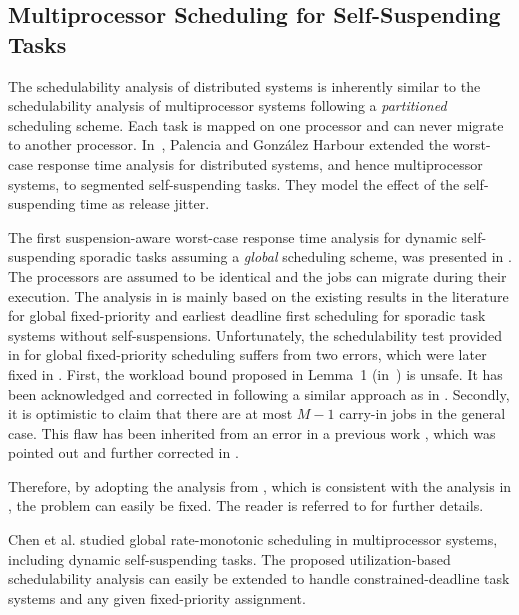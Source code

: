 \subsection{Multiprocessor Scheduling for Self-Suspending Tasks}
\label{sec:multiprocessor-HRT}
  
The schedulability analysis of distributed systems is inherently similar to the schedulability analysis of multiprocessor systems following a 
\emph{partitioned} scheduling scheme. Each task is mapped on one processor and can never migrate to another processor. In~\cite{PH:rtss98}, 
Palencia and Gonz\'alez Harbour extended the worst-case response time analysis for distributed systems, and hence multiprocessor systems, to segmented self-suspending tasks. They model the effect of the self-suspending time as release jitter.
  
The first suspension-aware worst-case response time analysis for dynamic self-suspending sporadic tasks assuming a \emph{global} scheduling scheme, was presented in \cite{DBLP:conf/ecrts/LiuA13}. 
The processors are assumed to be identical and the jobs can migrate during their execution. The analysis in \cite{DBLP:conf/ecrts/LiuA13} is mainly based on the existing results in the literature for global fixed-priority and earliest deadline first scheduling for sporadic task systems without self-suspensions. Unfortunately, the schedulability test provided in \cite{DBLP:conf/ecrts/LiuA13} for global fixed-priority scheduling suffers from two errors, which were later fixed in \cite{erratu-cong-anderson}. First, the workload bound proposed in Lemma~1 (in~\cite{DBLP:conf/ecrts/LiuA13}) is unsafe. It has been acknowledged and corrected in \cite{erratu-cong-anderson} following a similar approach as in \cite{baruah2007techniques}. 
Secondly, it is optimistic to claim that there are at most $M-1$ carry-in jobs in the general case. This flaw has been inherited from an error in a 
previous work \cite{DBLP:conf/rtss/GuanSYY09}, which was pointed out and further corrected in \cite{sun2014improving,DBLP:conf/rtns/HuangC15}. 

Therefore, by adopting the analysis from \cite{DBLP:conf/rtns/HuangC15}, which is consistent with the analysis in \cite{DBLP:conf/ecrts/LiuA13}, the problem can easily be fixed. The reader is referred to \cite{erratu-cong-anderson} for further details.
  
Chen et al. \cite{ChenHLRTSS2015} studied global rate-monotonic scheduling in multiprocessor systems, including dynamic self-suspending tasks. The proposed utilization-based schedulability analysis  can easily be extended to handle constrained-deadline task systems and any given fixed-priority assignment.
  
  




  